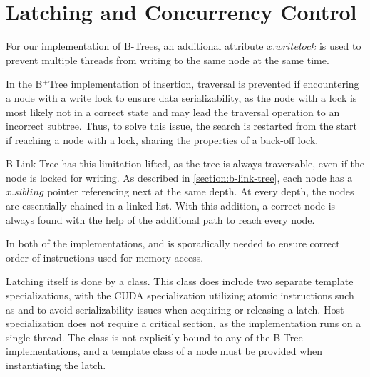 \section{Latching and Concurrency Control}

For our implementation of B-Trees, an additional attribute $x.writelock$ is used to prevent multiple threads from writing to the same node at the same time.

In the B$^+$Tree implementation of insertion, traversal is prevented if encountering a node with a write lock to ensure data serializability, as the node with a lock is most likely not in a correct state and may lead the traversal operation to an incorrect subtree. Thus, to solve this issue, the search is restarted from the start if reaching a node with a lock, sharing the properties of a back-off lock.

B-Link-Tree has this limitation lifted, as the tree is always traversable, even if the node is locked for writing. As described in \cref{section:b-link-tree}, each node has a $x.sibling$ pointer referencing next at the same depth. At every depth, the nodes are essentially chained in a linked list. With this addition, a correct node is always found with the help of the additional path to reach every node.

In both of the implementations,  and  is sporadically needed to ensure correct order of instructions used for memory access.

Latching itself is done by a  class. This class does include two separate template specializations, with the CUDA specialization utilizing atomic instructions such as  and  to avoid serializability issues when acquiring or releasing a latch. Host specialization does not require a critical section, as the implementation runs on a single thread. The class is not explicitly bound to any of the B-Tree implementations, and a template class of a node must be provided when instantiating the latch. 